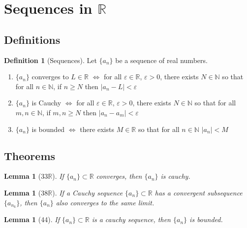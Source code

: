 \documentclass[12pt]{article}
\newtheorem{lem}[thm]{Lemma}  %
\theoremstyle{definition}
\newtheorem{defn}[thm]{Definition}
\theoremstyle{remark}
\numberwithin{equation}{section}
\newcommand\R{\mathbb R}    %
\newcommand\N{\mathbb N}    %
\begin{document}
\section{Sequences in $\R$}



\subsection{Definitions}

\begin{defn}[Sequences]
        Let $\{a_n\}$ be a sequence of real numbers.
        \begin{enumerate}
                \item $\{a_n\}$ converges to $L \in \R$ $\iff$ for all $\varepsilon \in \R$, $\varepsilon > 0$, there exists $N \in \N$ so that for all $n \in \N$, if $n \geq N$ then $|a_n - L| < \varepsilon$
                \item $\{a_n\}$ is Cauchy $\iff$ for all $\varepsilon \in \R$, $\varepsilon > 0$, there exists $N \in \N$ so that for all $m,n \in \N$, if $m,n \geq N$ then $|a_n - a_m| < \varepsilon$
                \item $\{a_n\}$ is bounded $\iff$ there exists $M \in \R$ so that for all $n \in \N$ $|a_n| < M$
        \end{enumerate}
\end{defn}








\subsection{Theorems}

\begin{lem}[33$\R$]
        If $\{a_n\} \subset \R$ converges, then $\{a_n\}$ is cauchy.
\end{lem}



\begin{lem}[38$\R$]
        If a Cauchy sequence $\{a_n\} \subset \R$ has a convergent subsequence $\{a_{n_k}\}$, then $\{a_n\}$ also converges to the same limit.
\end{lem}



\begin{lem}[44]
        If $\{a_n\} \subset \R$ is a cauchy sequence, then $\{a_n\}$ is bounded.
\end{lem}
\end{document}
